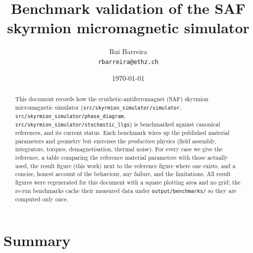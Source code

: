 \documentclass[11pt]{article}
\title{\textbf{Benchmark validation of the SAF skyrmion
micromagnetic simulator}}
\author{Rui Barreira \\ \texttt{rbarreira@ethz.ch}}
\date{\today}
\begin{document}
\maketitle

\begin{abstract}
\noindent
This document records how the synthetic-antiferromagnet (SAF)
skyrmion micromagnetic simulator (\texttt{src/skyrmion\_simulator/simulator},
\texttt{src/skyrmion\_simulator/phase\_diagram}, \texttt{src/skyrmion\_simulator/stochastic\_llgs}) is
benchmarked against canonical references, and its current status.
Each benchmark wires up the published material parameters and
geometry but exercises the \emph{production} physics
(field assembly, integrators, torques, demagnetisation, thermal
noise). For every case we give the reference, a table comparing
the reference material parameters with those actually used, the
result figure (this work) next to the reference figure where one
exists, and a concise, honest account of the behaviour, any
failure, and the limitations. All result figures were regenerated
for this document with a square plotting area and no grid; the
re-run benchmarks cache their measured data under
\texttt{output/benchmarks/} so they are computed only once.
\end{abstract}

\tableofcontents

\clearpage
\section{Summary}
\end{document}
